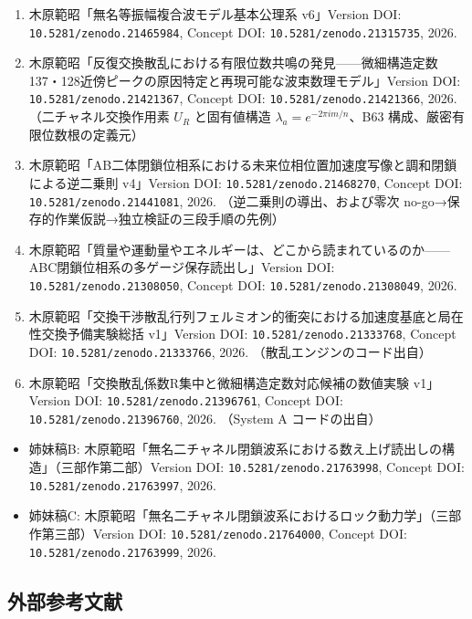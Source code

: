 \documentclass[
  a4paper,
]{ltjsarticle}
\providecommand{\tightlist}{%
  \setlength{\itemsep}{0pt}\setlength{\parskip}{0pt}}
\begin{document}
\begin{enumerate}
\def\labelenumi{\arabic{enumi}.}
\tightlist
\item
  木原範昭「無名等振幅複合波モデル基本公理系 v6」Version DOI:
  \texttt{10.5281/zenodo.21465984}, Concept DOI:
  \texttt{10.5281/zenodo.21315735}, 2026.
\item
  木原範昭「反復交換散乱における有限位数共鳴の発見------微細構造定数137・128近傍ピークの原因特定と再現可能な波束数理モデル」Version
  DOI: \texttt{10.5281/zenodo.21421367}, Concept DOI:
  \texttt{10.5281/zenodo.21421366}, 2026. （二チャネル交換作用素 \(U_R\)
  と固有値構造 \(\lambda_a=e^{-2\pi i m/n}\)、B63
  構成、厳密有限位数根の定義元）
\item
  木原範昭「AB二体閉鎖位相系における未来位相位置加速度写像と調和閉鎖による逆二乗則
  v4」Version DOI: \texttt{10.5281/zenodo.21468270}, Concept DOI:
  \texttt{10.5281/zenodo.21441081}, 2026. （逆二乗則の導出、および零次
  no-go→保存的作業仮説→独立検証の三段手順の先例）
\item
  木原範昭「質量や運動量やエネルギーは、どこから読まれているのか------ABC閉鎖位相系の多ゲージ保存読出し」Version
  DOI: \texttt{10.5281/zenodo.21308050}, Concept DOI:
  \texttt{10.5281/zenodo.21308049}, 2026.
\item
  木原範昭「交換干渉散乱行列フェルミオン的衝突における加速度基底と局在性交換予備実験総括
  v1」Version DOI: \texttt{10.5281/zenodo.21333768}, Concept DOI:
  \texttt{10.5281/zenodo.21333766}, 2026. （散乱エンジンのコード出自）
\item
  木原範昭「交換散乱係数R集中と微細構造定数対応候補の数値実験
  v1」Version DOI: \texttt{10.5281/zenodo.21396761}, Concept DOI:
  \texttt{10.5281/zenodo.21396760}, 2026. （System A コードの出自）
\end{enumerate}

\begin{itemize}
\tightlist
\item
  姉妹稿B:
  木原範昭「無名二チャネル閉鎖波系における数え上げ読出しの構造」（三部作第二部）Version
  DOI: \texttt{10.5281/zenodo.21763998}, Concept DOI:
  \texttt{10.5281/zenodo.21763997}, 2026.
\item
  姉妹稿C:
  木原範昭「無名二チャネル閉鎖波系におけるロック動力学」（三部作第三部）Version
  DOI: \texttt{10.5281/zenodo.21764000}, Concept DOI:
  \texttt{10.5281/zenodo.21763999}, 2026.
\end{itemize}

\subsection{外部参考文献}\label{ux5916ux90e8ux53c2ux8003ux6587ux732e}
\end{document}
